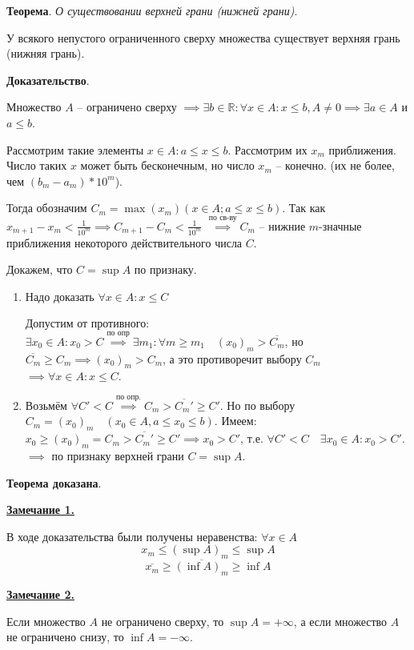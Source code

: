 \documentclass{article}
\newcommand{\bydef}{\stackrel{\text{по опр.}}{\implies}} %
\newcommand{\parspace}{\vspace{10pt}}
\theoremstyle{break}
\begin{document}
\textbf{Теорема}. \textit{О существовании верхней грани (нижней грани)}.

У всякого непустого ограниченного сверху множества существует верхняя грань (нижняя грань).

\textbf{Доказательство}.

Множество $A$ -- ограничено сверху $\implies \exists b \in \mathbb{R}: \forall x \in A:
x \le b, A \ne 0 \implies \exists a \in A$ и $a \le b$.

Рассмотрим такие элементы $x \in A: a \le x \le b$. Рассмотрим их $x_m$ приближения.
Число таких $x$ может быть бесконечным, но число $x_m$ -- конечно.
(их не более, чем $(b_m - a_m) * 10^m$). 

Тогда обозначим $C_m = \max (x_m) (x \in A; a \le x \le b)$.
Так как $x_{m+1} - x_m < \frac{1}{10^m} \implies C_{m+1} - C_m < \frac{1}{10^m}$
$\stackrel{\text{по св-ву}}{\implies} C_m$ -- нижние $m$-значные приближения некоторого 
действительного числа $C$.

Докажем, что $C = \sup A$ по признаку.
\begin{enumerate}
    \item Надо доказать $\forall x \in A: x \le C$
    
    Допустим от противного: $\exists x_0 \in A: x_0 > C \stackrel{\text{по опр}}{\implies}
    \exists m_1: \forall m \ge m_1 \quad (x_0)_m > \overline{C_m}$, но
    $\overline{C_m} \ge C_m \implies (x_0)_m > C_m$, а это противоречит выбору $C_m$
    $\implies \forall x \in A: x \le C$.

    \item Возьмём $\forall C' < C \bydef C_m > \overline{C_m'} \ge C'$.
    Но по выбору $C_m = (x_0)_m \quad (x_0 \in A, a \le x_0 \le b)$.
    Имеем: $x_0 \ge (x_0)_m = C_m > \overline{C_m'} \ge C' \implies x_0 > C'$,
    т.е. $\forall C' < C \quad \exists x_0 \in A: x_0 > C'$.
    $\implies$ по признаку верхней грани $C = \sup A$.
\end{enumerate}

\textbf{Теорема доказана}.

\parspace

\underline{\textbf{Замечание 1.}}

В ходе доказательства были получены неравенства: $\forall x \in A$
\[x_m \le (\sup A)_m \le \sup A\]
\[\overline{x_m} \ge \overline{(\inf A)_m} \ge \inf A\]

\parspace

\underline{\textbf{Замечание 2.}}

Если множество $A$ не ограничено сверху, то $\sup A = + \infty$, а если множество $A$
не ограничено снизу, то $\inf A = - \infty$.
\end{document}
